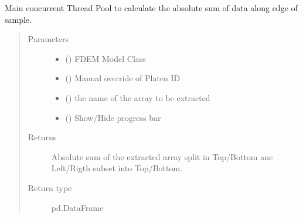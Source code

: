 \documentclass[letterpaper,10pt,english]{sphinxmanual}
\begin{document}

\begin{fulllineitems}
\label{\detokenize{openfdem:openfdem.rotary_ds_thread_pool_generators.main}}
Main concurrent Thread Pool to calculate the absolute sum of data along edge of sample.
\begin{quote}\begin{description}
\item[{Parameters}] \leavevmode\begin{itemize}
\item {} 
 ({\hyperref[\detokenize{openfdem:openfdem.openfdem.Model}]{}}) \textendash{} FDEM Model Class

\item {} 
 () \textendash{} Manual override of Platen ID

\item {} 
 () \textendash{} the name of the array to be extracted

\item {} 
 () \textendash{} Show/Hide progress bar

\end{itemize}

\item[{Returns}] \leavevmode
Absolute sum of the extracted array split in Top/Bottom ane Left/Rigth sub\sphinxhyphen{}set into Top/Bottom.

\item[{Return type}] \leavevmode
pd.DataFrame

\end{description}\end{quote}

\end{fulllineitems}
\end{document}
